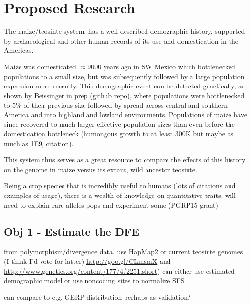 \documentclass[10pt, letterpaper]{article}
\begin{document}
\section*{Proposed Research}
	
The maize/teosinte system, has a well described demographic history, supported by archaeological and other human records of its use and domestication in the Americas.

Maize was domesticated $\approx$9000 years ago in SW Mexico which bottlenecked populations to a small size, but was subsequently followed by a large population expansion more recently. This demographic event can be detected genetically, as shown by Beissinger in prep (github repo), where populations were bottlenecked to 5\% of their previous size followed by spread across central and southern America and into highland and lowland environments. Populations of maize have since recovered to much larger effective population sizes than even before the domestication bottleneck (humongous growth to at least 300K but maybe as much as 1E9, citation).

This system thus serves as a great resource to compare the effects of this history on the genome in maize versus its extant, wild ancestor teosinte.

Being a crop species that is incredibly useful to humans (lots of citations and examples of usage), there is a wealth of knowledge on quantitative traits. 
will need to explain rare alleles pops and experiment some (PGRP15 grant)



\subsection{Obj 1 - Estimate the DFE}
	from polymorphism/divergence data. use HapMap2 or current teosinte genomes (I think I'd vote for latter)
	\url{http://goo.gl/CLmsmX} and \url{http://www.genetics.org/content/177/4/2251.short})
	can either use estimated demographic model or use noncoding sites to normalize SFS
	
	can compare to e.g. GERP distribution perhaps as validation?
		
\end{document}

